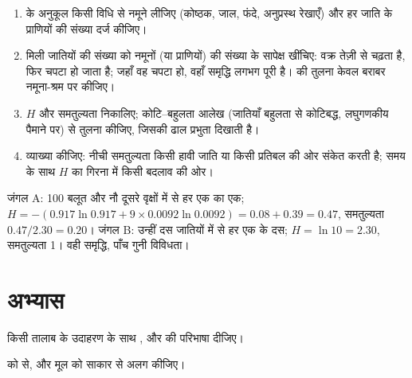 \begin{method}[किसी समुदाय से नमूने लेना]\label{met:b1:ecosystem-organization:sampling}
\begin{enumerate}
  \item {} के अनुकूल किसी विधि से नमूने लीजिए (कोष्ठक, जाल, फंदे,
        अनुप्रस्थ रेखाएँ) और हर जाति के प्राणियों की संख्या दर्ज
        कीजिए।
  \item मिली जातियों की संख्या को नमूनों (या प्राणियों) की संख्या के
        सापेक्ष खींचिए: वक्र तेज़ी से चढ़ता है, फिर चपटा हो जाता है;
        जहाँ वह चपटा हो, वहाँ समृद्धि लगभग पूरी है।  की तुलना
        केवल बराबर नमूना-श्रम पर कीजिए।
  \item $H$ और समतुल्यता निकालिए; कोटि--बहुलता आलेख (जातियाँ बहुलता से
        कोटिबद्ध, लघुगणकीय पैमाने पर) से तुलना कीजिए, जिसकी ढाल
        प्रभुता दिखाती है।
  \item व्याख्या कीजिए: नीची समतुल्यता किसी हावी जाति या किसी प्रतिबल
        की ओर संकेत करती है; समय के साथ $H$ का गिरना  में किसी
        बदलाव की ओर।
\end{enumerate}
\end{method}

\begin{example}[दो जंगल]\label{ex:b1:ecosystem-organization:twowoods}
जंगल A: 100 बलूत और नौ दूसरे वृक्षों में से हर एक का एक; $H = -(0.917\ln
0.917 + 9\times 0.0092\ln 0.0092) = 0.08 + 0.39 = 0.47$, समतुल्यता
$0.47/2.30 = 0.20$। जंगल B: उन्हीं दस जातियों में से हर एक के दस; $H =
\ln 10 = 2.30$, समतुल्यता 1। वही समृद्धि, पाँच गुनी विविधता।
\end{example}

\section{अभ्यास}

\begin{exercise}[$\star$]\label{exo:b1:ecosystem-organization:1}
किसी तालाब के उदाहरण के साथ ,  और  की परिभाषा दीजिए।
\end{exercise}

\begin{exercise}[$\star$]\label{exo:b1:ecosystem-organization:2}
 को  से, और मूल  को साकार  से अलग कीजिए।
\end{exercise}

